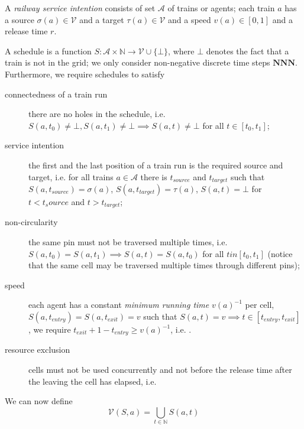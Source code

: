 \documentclass{article}
\begin{document}
A \emph{railway service intention} consists of set $\mathcal{A}$ of trains or agents; each train $a$ has a source $\sigma(a)\in\mathcal{V}$ and a target $\tau(a)\in\mathcal{V}$ and a speed $v(a) \in [0,1]$ and a release time $r$.
%

A schedule is a function $S: \mathcal{A}\times \mathbb{N} \to \mathcal{V} \cup \{ \bot \}$, where $\bot$ denotes the fact that a train is not in the grid; we only consider non-negative discrete time steps $\mathbf{NNN}$. Furthermore, we require schedules to satisfy
\begin{description}
\item[connectedness of a train run] there are no holes in the schedule, i.e. $S(a,t_0) \not= \bot, S(a,t_1)\not=\bot \implies S(a,t)\not=\bot$ for all $t \in [t_0,t_1]$;
\item[service intention] the first and the last position of a train run is the required source and target, i.e. for all trains $a \in \mathcal{A}$ there is $t_{source}$ and $t_{target}$ such that $S(a,t_{source})=\sigma(a)$, $S(a,t_{target})=\tau(a)$, $S(a,t)=\bot$ for $t<t_source$ and $t>t_{target}$;
\item[non-circularity] the same pin must not be traversed multiple times, i.e. $S(a,t_0)= S(a,t_1) \implies S(a,t)=S(a,t_0)$ for all $t in [t_0,t_1]$ (notice that the same cell may be traversed multiple times through different pins);
\item[speed] each agent has a constant \emph{minimum running time} ${v(a)}^{-1}$ per cell, $S(a,t_{entry})= S(a,t_{exit})=v$ such that $S(a,t)=v \implies t\in[t_{entry},t_{exit}]$, we require $t_{exit}+1-t_{entry}\geq {v(a)}^{-1}$, i.e. .
\item[resource exclusion] cells must not be used concurrently and not before the release time after the leaving the cell has elapsed, i.e.
\end{description}
We can now define
\begin{equation*}
\mathcal{V}(S,a) = \bigcup_{t\in\mathbb{N}} S(a,t)
\end{equation*}
\end{document}

